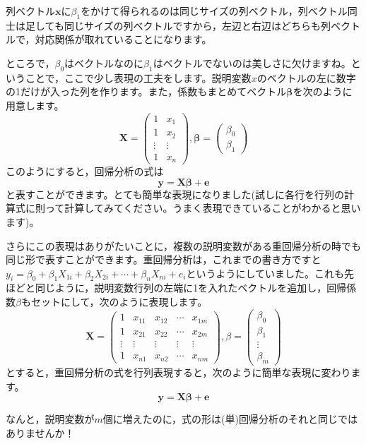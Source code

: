 \documentclass{ltjsbook}
\begin{document}
列ベクトル$\bm{x}$に$\beta_1$をかけて得られるのは同じサイズの列ベクトル，列ベクトル同士は足しても同じサイズの列ベクトルですから，左辺と右辺はどちらも列ベクトルで，対応関係が取れていることになります。

ところで，$\beta_0$はベクトルなのに$\beta_1$はベクトルでないのは美しさに欠けますね。ということで，ここで少し表現の工夫をします。説明変数$x$のベクトルの左に数字の1だけが入った列を作ります。また，係数もまとめてベクトル$\bm{\beta}$を次のように用意します。
\[
	\bm{X} =
	\begin{pmatrix}
		1      & x_1    \\
		1      & x_2    \\
		\vdots & \vdots \\
		1      & x_n
	\end{pmatrix},
	\bm{\beta}=
	\begin{pmatrix}
		\beta_0 \\
		\beta_1
	\end{pmatrix}
\]
このようにすると，回帰分析の式は
\[ \bm{y} = \bm{X\beta} + \bm{e} \]
と表すことができます。とても簡単な表現になりました(試しに各行を行列の計算式に則って計算してみてください。うまく表現できていることがわかると思います)。

さらにこの表現はありがたいことに，複数の説明変数がある重回帰分析の時でも同じ形で表すことができます。重回帰分析は，これまでの書き方ですと$y_{i} = \beta_0  + \beta_1 X_{1i} + \beta_2 X_{2i} + \cdots + \beta_n X_{ni} + e_i$というようにしていました。これも先ほどと同じように，説明変数行列の左端に1を入れたベクトルを追加し，回帰係数$\beta$もセットにして，次のように表現します。
\[
	\bm{X} = \begin{pmatrix}
		1      & x_{11} & x_{12} & \cdots & x_{1m} \\
		1      & x_{21} & x_{22} & \cdots & x_{2m} \\
		\vdots & \vdots & \vdots & \vdots & \vdots \\
		1      & x_{n1} & x_{n2} & \cdots & x_{nm}
	\end{pmatrix},
	\beta=\begin{pmatrix}
		\beta_0 \\
		\beta_1 \\
		\vdots  \\
		\beta_m
	\end{pmatrix}
\]
とすると，重回帰分析の式を行列表現すると，次のように簡単な表現に変わります。
\[ \bm{y} = \bm{X \beta} + \bm{e} \]

なんと，説明変数が$m$個に増えたのに，式の形は(単)回帰分析のそれと同じではありませんか！
\end{document}

